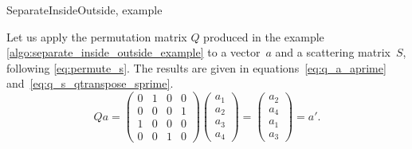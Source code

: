 \begin{algorithm}[H]
    \caption{SeparateInsideOutside, example}
    \label{algo:separate_inside_outside_example}
    \begin{algorithmic}
         
    \end{algorithmic}
\end{algorithm}
Let us apply the permutation matrix $Q$ produced in the example \cref{algo:separate_inside_outside_example} to a vector~$a$ and a scattering matrix~$S$, following \cref{eq:permute_s}.
The results are given in equations~\eqref{eq:q_a_aprime} and~\eqref{eq:q_s_qtranspose_sprime}.
\begin{equation}
    Q a
    =
    \begin{pmatrix}
        0 & 1 & 0 & 0\\
        0 & 0 & 0 & 1\\
        1 & 0 & 0 & 0\\
        0 & 0 & 1 & 0
    \end{pmatrix}
    \begin{pmatrix}
        a_1 \\ a_2 \\ a_3 \\ a_4
    \end{pmatrix}
    =
    \begin{pmatrix}
        a_2 \\ a_4 \\ a_1 \\ a_3
    \end{pmatrix}
    =
    a'\text{.}
    \label{eq:q_a_aprime}
\end{equation}
